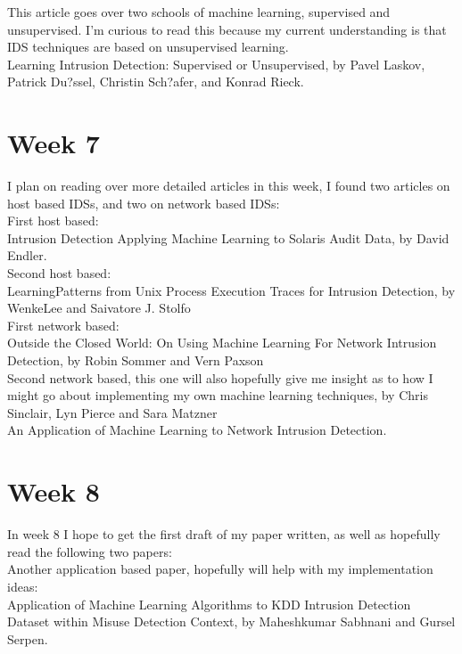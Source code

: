 \documentclass{article}
\begin{document}
This article goes over two schools of machine learning, supervised and unsupervised. I'm curious to read this because my current understanding is that IDS techniques are based on unsupervised learning.\\
Learning Intrusion Detection: Supervised or Unsupervised, by Pavel Laskov, Patrick Du?ssel, Christin Sch?afer, and Konrad Rieck.\\

\section*{Week 7}
I plan on reading over more detailed articles in this week, I found two articles on host based IDSs, and two on network based IDSs:\\

First host based:\\
Intrusion Detection Applying Machine Learning to Solaris Audit Data, by David Endler.\\

Second host based:\\
LearningPatterns from Unix Process Execution Traces for Intrusion Detection, by WenkeLee and Saivatore J. Stolfo\\

First network based:\\
Outside the Closed World: On Using Machine Learning For Network Intrusion Detection, by Robin Sommer and Vern Paxson\\

Second network based, this one will also hopefully give me insight as to how I might go about implementing my own machine learning techniques, by Chris Sinclair, Lyn Pierce and Sara Matzner\\
An Application of Machine Learning to Network Intrusion Detection.\\

\section*{Week 8}
In week 8 I hope to get the first draft of my paper written, as well as hopefully read the following two papers:\\

Another application based paper, hopefully will help with my implementation ideas:\\
Application of Machine Learning Algorithms to KDD Intrusion Detection Dataset within Misuse Detection Context, by Maheshkumar Sabhnani and Gursel Serpen.\\
\end{document}

